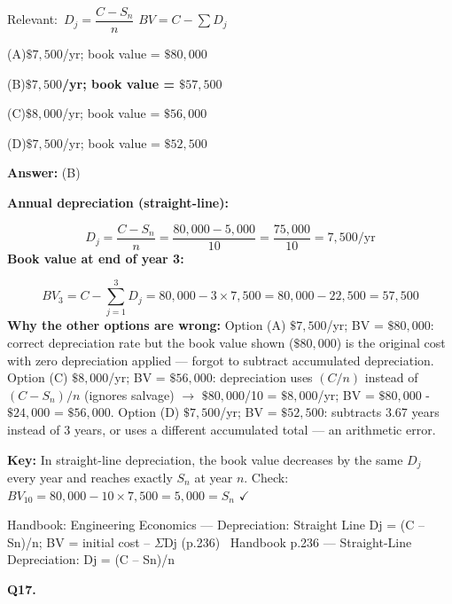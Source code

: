 \documentclass[11pt]{article}
\newcommand{\correct}[1]{\textbf{#1}\;{\color{accent}$\checkmark$}}
\newcommand{\optline}[2]{\par\noindent\hspace{1.2em}(#1)\hspace{0.6em}#2}
\begin{document}
{\small\color{soft}Relevant:}\ $D_j = \dfrac{C - S_n}{n}$ \quad $BV = C - \sum D_j$\par\vspace{3pt}
\optline{A}{$\$7{,}500$/yr; book value = $\$80{,}000$}
\optline{B}{\correct{$\$7{,}500$/yr; book value = $\$57{,}500$}}
\optline{C}{$\$8{,}000$/yr; book value = $\$56{,}000$}
\optline{D}{$\$7{,}500$/yr; book value = $\$52{,}500$}
\par\vspace{3pt}
\vspace{2pt}\par\noindent\colorbox{boxbg}{\parbox{\dimexpr\linewidth-2\fboxsep\relax}{%
\vspace{2pt}\textbf{Answer:} (B)\par\vspace{2pt}
{\small \textbf{Annual depreciation (straight-line):}\par
\[D_j = \frac{C - S_n}{n} = \frac{80{,}000 - 5{,}000}{10} = \frac{75{,}000}{10} = 7{,}500/\text{yr}\]
\textbf{Book value at end of year 3:}\par
\[BV_3 = C - \sum_{j=1}^{3} D_j = 80{,}000 - 3 \times 7{,}500 = 80{,}000 - 22{,}500 = 57{,}500\]
\textbf{Why the other options are wrong:} Option (A) $\$7{,}500$/yr; BV = $\$80{,}000$: correct depreciation rate but the book value shown ($\$80{,}000$) is the original cost with zero depreciation applied --- forgot to subtract accumulated depreciation. Option (C) $\$8{,}000$/yr; BV = $\$56{,}000$: depreciation uses $(C/n)$ instead of $(C - S_n)/n$ (ignores salvage) $\rightarrow$ $\$80{,}000$/10 = $\$8{,}000$/yr; BV = $\$80{,}000$ - $\$24{,}000$ = $\$56{,}000$. Option (D) $\$7{,}500$/yr; BV = $\$52{,}500$: subtracts 3.67 years instead of 3 years, or uses a different accumulated total --- an arithmetic error.\par
\textbf{Key:} In straight-line depreciation, the book value decreases by the same $D_j$ every year and reaches exactly $S_n$ at year $n$. Check: $BV_{10} = 80{,}000 - 10 \times 7{,}500 = 5{,}000 = S_n$ $\checkmark$\par}\par\vspace{2pt}
{\footnotesize\color{soft}Handbook: Engineering Economics --- Depreciation: Straight Line Dj = (C -- Sn)/n; BV = initial cost -- $\Sigma$Dj (p.236) \textbullet\ Handbook p.236 --- Straight-Line Depreciation: Dj = (C -- Sn)/n}\vspace{2pt}
}}
\vspace{9pt}
\filbreak
\textbf{\color{accent}Q17.}\par\vspace{2pt}
\end{document}
